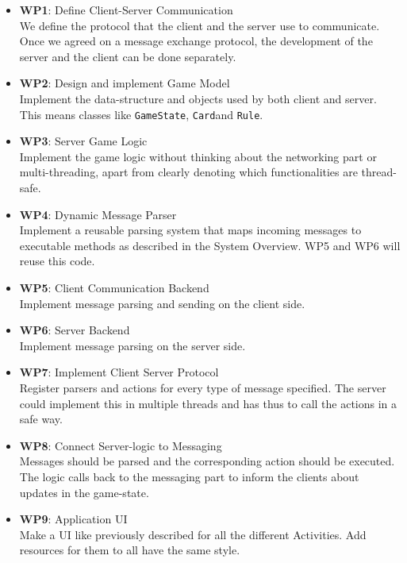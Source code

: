 \documentclass{sig-alternate}
\begin{document}
\begin{itemize}
	
        \item {\bf WP1}: Define Client-Server Communication\\
        We define the protocol that the client and the server use to communicate. Once we agreed on a message exchange protocol, the development of the server and the client can be done separately.
        
        \item {\bf WP2}: Design and implement Game Model\\
        Implement the data-structure and objects used by both client and server. This means classes like \verb|GameState|, \verb|Card|and \verb|Rule|.
        
        \item {\bf WP3}: Server Game Logic\\
        Implement the game logic without thinking about the networking part or multi-threading, apart from clearly denoting which functionalities are thread-safe.
        
        \item {\bf WP4}: Dynamic Message Parser\\
	Implement a reusable parsing system that maps incoming messages to executable methods as described in the System Overview. WP5 and WP6 will reuse this code.
           
        \item {\bf WP5}: Client Communication Backend\\
	Implement message parsing and sending on the client side.
		
	\item {\bf WP6}: Server Backend\\
	Implement message parsing on the server side.
		
	\item {\bf WP7}: Implement Client Server Protocol\\
	Register parsers and actions for every type of message specified. The server could implement this in multiple threads and has thus to call the actions in a safe way.
		
	\item {\bf WP8}: Connect Server-logic to Messaging\\
	Messages should be parsed and the corresponding action should be executed. The logic calls back to the messaging part to inform the clients about updates in the game-state.
	\item {\bf WP9}: Application UI\\
	Make a UI like previously described for all the different Activities. Add resources for them to all have the same style.
		

\end{itemize}
\end{document}
